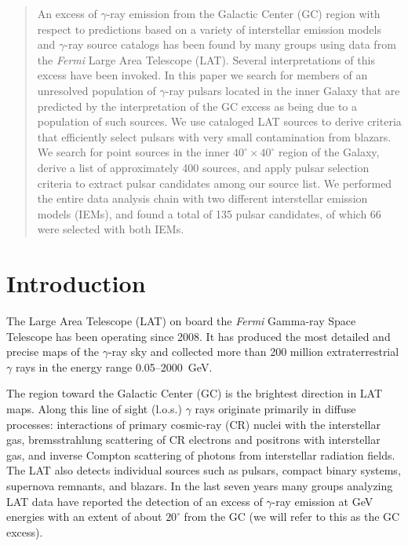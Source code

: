 \documentclass[iop]{emulateapj}
\begin{document}
\begin{abstract}
  An excess of $\gamma$-ray emission from the Galactic Center (GC)
  region with respect to predictions based on a variety of
  interstellar emission models and $\gamma$-ray source catalogs has
  been found by many groups using data from the {\it Fermi} Large Area
  Telescope (LAT). Several interpretations of this excess have been
  invoked. In this paper we search for members of an unresolved
  population of $\gamma$-ray pulsars located in the inner Galaxy that 
  are predicted by the interpretation of the GC excess as being due to a
  population of such sources.
  We use cataloged LAT sources to derive criteria that efficiently
  select pulsars with very small contamination from blazars.  We
  search for point sources in the inner $40^\circ\times40^\circ$
  region of the Galaxy, derive a list of approximately 400 sources,
  and apply pulsar selection criteria to extract pulsar candidates
  among our source list. We performed the entire data analysis
  chain with two different interstellar emission models (IEMs), and found
  a total of 135 pulsar candidates, of which 66 were selected with 
  both IEMs.
\end{abstract}

\maketitle




\section{Introduction}
The Large Area Telescope (LAT) on board the {\it Fermi} Gamma-ray Space Telescope
has been operating since 2008.  It has produced the most
detailed and precise maps of the $\gamma$-ray sky and collected
more than 200 million extraterrestrial $\gamma$ rays in the energy
range 0.05--2000~GeV.

The region toward the Galactic Center (GC) is the brightest direction
in LAT maps. Along this line of sight (l.o.s.) $\gamma$
  rays originate primarily in diffuse processes: interactions of
primary cosmic-ray (CR) nuclei with the interstellar gas,
bremsstrahlung scattering of CR electrons and positrons with
interstellar gas, and inverse Compton scattering of photons from
interstellar radiation fields.  The LAT also detects individual
sources such as pulsars, compact binary systems, supernova remnants,
and blazars.  In the last seven years many groups analyzing LAT data
have reported the detection of an excess of $\gamma$-ray emission at
GeV energies with an extent of about $20^\circ$ from the GC (we will
refer to this as the GC excess).
\end{document}
